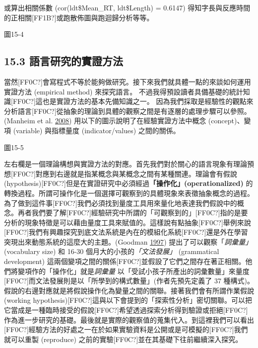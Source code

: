 或算出相關係數 (cor(ldt\$Mean\_RT, ldt\$Length) = 0.6147) 得知字長與反應時間的正相關[FF1B?]或跑散佈圖與跑迴歸分析等等。

  
 

圖15-4

\subsection{15.3 語言研究的實證方法}

當然[FF0C?]會寫程式不等於能夠做研究。接下來我們就具體一點的來談如何運用實證方法 (empirical method) 來探究語言。 不過我得預設讀者具備基礎的統計知識[FF0C?]這也是實證方法的基本先備知識之一。 因為我們採取是經驗性的觀點來分析語言[FF0C?]從抽象的理論到具體的觀察之間是有逐層的處理步驟可以參照。(Manheim et al. \hyperlink{bookmarkidnmf14n}{2008}) 用以下的圖示說明了在經驗實證方法中概念 (concept)、變項 (variable) 與指標量度 (indicator/values) 之間的關係。

  
 

圖15-5

左右欄是一個理論構想與實證方法的對應。首先我們對於關心的語言現象有理論預想[FF0C?]對應到右邊就是指某概念與某概念之間有某種關連。理論會有假說 (hypothesis)[FF0C?]但是在實證研究中必須經過\textbf{「操作化」(operationalized)} 的轉換過程。所謂可操作化是一個選擇可觀察到的具體現象來表徵抽象概念的過程。為了做到這件事[FF0C?]我們必須找到量度工具用來量化地表達我們假說中的概念。再者我們要了解[FF0C?]經驗研究中所謂的「可觀察到的」[FF0C?]指的是要分析的現象特徵是可以藉由量度工具來賦值的。這樣說有點抽象[FF0C?]舉例來說[FF0C?]我們有興趣探究到底文法系統是內在的模組化系統[FF0C?]還是外在學習突現出來動態系統的這麼大的主題。(Goodman \hyperlink{bookmarkidvx1227}{1997}) 提出了可以觀察「\textit{詞彙量」} (vocabulary size) 和 16-30 個月大的小孩的\textit{「文法發展」} (grammatical development) 這兩個變項之間的關係[FF0C?]並假設了它們之間存在著正相關。他們將變項作的「操作化」就是\textit{詞彙量} 以「受試小孩子所產出的詞彙數量」來量度[FF0C?]而文法發展則是以「所學到的構式數量」(作者先預先定義了 37 種構式)。假說的右邊對應就是將假說操作化為變量之間的關聯。接著我們會有所謂作業假說 (working hypothesis)[FF0C?]這與以下會提到的「探索性分析」密切關聯。可以把它當成是一種臨時接受的假說[FF0C?]希望透過探索分析得到驗證或拒絕[FF0C?]作為進一步研究的基礎。最後就是實際的觀察值的蒐集代入。到這裡我們可以看出[FF0C?]經驗方法的好處之一在於如果實驗資料是公開或是可模擬的[FF0C?]我們就可以重製 (reproduce) 之前的實驗[FF0C?]並在其基礎下往前繼續深入探究。

